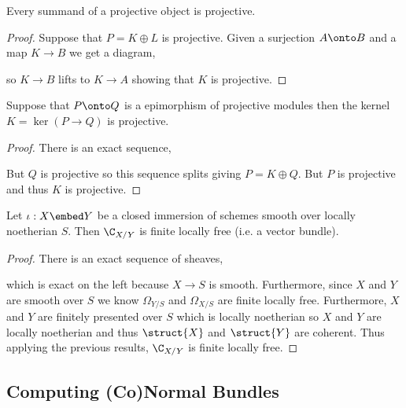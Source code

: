 \documentclass[12pt]{article}
\begin{document}
\begin{lemma}
Every summand of a projective object is projective. 
\end{lemma}

\begin{proof}
Suppose that $P = K \oplus L$ is projective. Given a surjection $A \onto B$ and a map $K \to B$ we get a diagram,
\begin{center}
\end{center}
so $K \to B$ lifts to $K \to A$ showing that $K$ is projective.
\end{proof}

\begin{cor}
Suppose that $P \onto Q$ is a epimorphism of projective modules then the kernel $K = \ker{(P \to Q)}$ is projective.
\end{cor}

\begin{proof}
There is an exact sequence,
\begin{center}
\end{center}
But $Q$ is projective so this sequence splits giving $P = K \oplus Q$. But $P$ is projective and thus $K$ is projective.
\end{proof}

\begin{prop}
Let $\iota : X \embed Y$ be a closed immersion of schemes smooth over locally noetherian $S$. Then $\C_{X/Y}$ is finite locally free (i.e. a vector bundle).
\end{prop}

\begin{proof}
There is an exact sequence of sheaves,
\begin{center}
\end{center}
which is exact on the left because $X \to S$ is smooth. Furthermore, since $X$ and $Y$ are smooth over $S$ we know $\Omega_{Y/S}$ and $\Omega_{X/S}$ are finite locally free. Furthermore, $X$ and $Y$ are finitely presented over $S$ which is locally noetherian so $X$ and $Y$ are locally noetherian and thus $\struct{X}$ and $\struct{Y}$ are coherent. Thus applying the previous results, $\C_{X/Y}$ is finite locally free.
\end{proof}

\subsection{Computing (Co)Normal Bundles}
\end{document}
